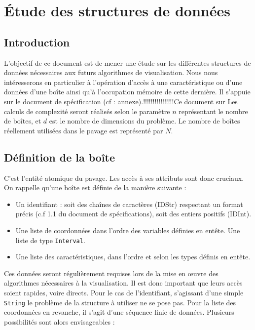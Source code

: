 \chapter{Étude des structures de données}







\section{Introduction}
L'objectif de ce document est de mener une étude sur les différentes structures de données nécessaires aux futurs algorithmes de visualisation. Nous nous intéresserons en particulier à l'opération d'accès à une caractéristique ou d'une données d'une boîte ainsi qu'à l'occupation mémoire de cette dernière. Il s'appuie sur le document de spécification (cf : annexe).!!!!!!!!!!!!!!!!Ce document sur Les calculs de complexité seront réalisés selon le paramètre $n$  représentant le nombre de boîtes, et $d$ est le nombre de dimensions du problème. Le nombre de boîtes réellement utilisées dans le pavage est représenté par $N$. 


\section{Définition de la boîte}
C'est l'entité atomique du pavage. Les accès à ses attributs sont donc cruciaux. On rappelle qu'une boîte est définie de la manière suivante : 
\begin{itemize}
\item 
  Un identifiant : soit des chaînes de caractères (IDStr) respectant un format précis (c.f 1.1 du document de spécifications), soit des entiers positifs (IDInt).
\item
  Une liste de coordonnées dans l'ordre des variables définies en entête. Une liste de type \verb+Interval+.
\item
  Une liste des caractéristiques, dans l'ordre et selon les types définis en entête.
\end{itemize}
Ces données seront régulièrement requises lors de la mise en œuvre des algorithmes nécessaires à la visualisation. Il est donc important que leurs accès soient rapides, voire directs. Pour le cas de l'identifiant, s'agissant d'une simple \verb+String+ le problème de la structure à utiliser ne se pose pas. Pour la liste des coordonnées en revanche, il s'agit d'une séquence finie de données. Plusieurs possibilités sont alors envisageables : 

